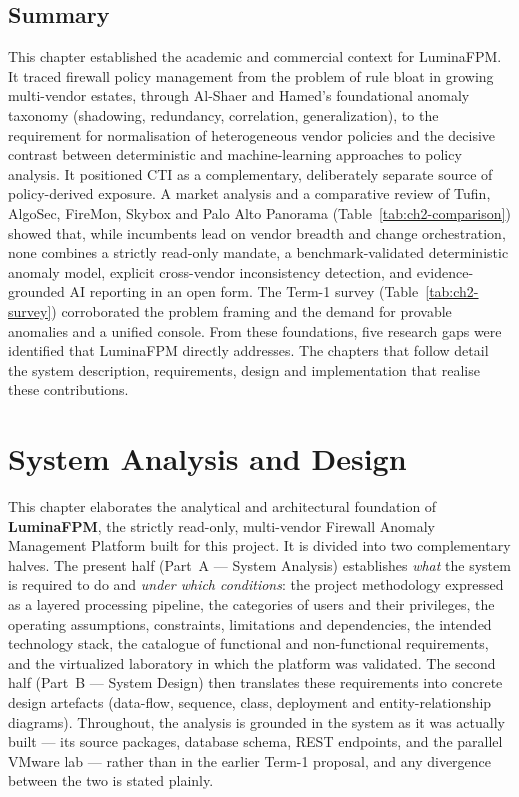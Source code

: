 \documentclass[12pt,a4paper]{report}
\renewcommand{\_}{\textunderscore\allowbreak}
\begin{document}
\section{Summary}
\label{sec:ch2-summary}
This chapter established the academic and commercial context for LuminaFPM. It traced firewall policy management from the problem of rule bloat in growing multi-vendor estates, through Al-Shaer and Hamed's foundational anomaly taxonomy (shadowing, redundancy, correlation, generalization), to the requirement for normalisation of heterogeneous vendor policies and the decisive contrast between deterministic and machine-learning approaches to policy analysis. It positioned CTI as a complementary, deliberately separate source of policy-derived exposure. A market analysis and a comparative review of Tufin, AlgoSec, FireMon, Skybox and Palo Alto Panorama (Table~\ref{tab:ch2-comparison}) showed that, while incumbents lead on vendor breadth and change orchestration, none combines a strictly read-only mandate, a benchmark-validated deterministic anomaly model, explicit cross-vendor inconsistency detection, and evidence-grounded AI reporting in an open form. The Term-1 survey (Table~\ref{tab:ch2-survey}) corroborated the problem framing and the demand for provable anomalies and a unified console. From these foundations, five research gaps were identified that LuminaFPM directly addresses. The chapters that follow detail the system description, requirements, design and implementation that realise these contributions.

\chapter{System Analysis and Design}
\label{ch:analysis-design}

This chapter elaborates the analytical and architectural foundation of \textbf{LuminaFPM}, the strictly read-only, multi-vendor Firewall Anomaly Management Platform built for this project. It is divided into two complementary halves. The present half (Part~A — System Analysis) establishes \emph{what} the system is required to do and \emph{under which conditions}: the project methodology expressed as a layered processing pipeline, the categories of users and their privileges, the operating assumptions, constraints, limitations and dependencies, the intended technology stack, the catalogue of functional and non-functional requirements, and the virtualized laboratory in which the platform was validated. The second half (Part~B — System Design) then translates these requirements into concrete design artefacts (data-flow, sequence, class, deployment and entity-relationship diagrams). Throughout, the analysis is grounded in the system as it was actually built — its source packages, database schema, REST endpoints, and the parallel VMware lab — rather than in the earlier Term-1 proposal, and any divergence between the two is stated plainly.
\end{document}
